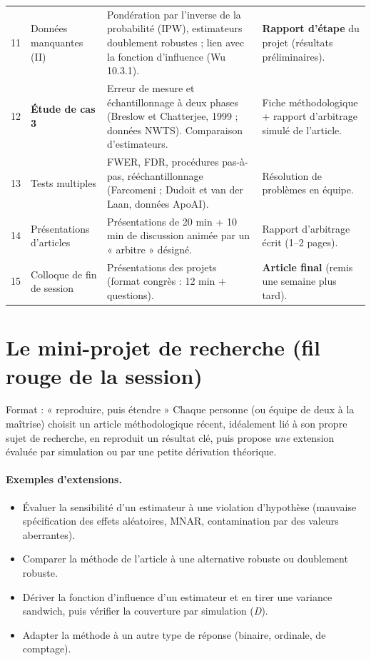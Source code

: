 \documentclass[11pt]{article}
\begin{document}
\begin{longtable}{@{}c L{3.6cm} L{6.3cm} L{4.2cm}@{}}
11 & Données manquantes (II) &
Pondération par l'inverse de la probabilité (IPW), estimateurs doublement robustes ;
lien avec la fonction d'influence (Wu 10.3.1). &
\textbf{Rapport d'étape} du projet (résultats préliminaires).\\
12 & \textbf{Étude de cas 3} &
Erreur de mesure et échantillonnage à deux phases (Breslow et Chatterjee, 1999 ;
données NWTS). Comparaison d'estimateurs. &
Fiche méthodologique + rapport d'arbitrage simulé de l'article.\\
13 & Tests multiples &
FWER, FDR, procédures pas-à-pas, rééchantillonnage (Farcomeni ; Dudoit et van der Laan,
données ApoAI). &
Résolution de problèmes en équipe.\\
14 & Présentations d'articles &
Présentations de 20 min + 10 min de discussion animée par un « arbitre » désigné. &
Rapport d'arbitrage écrit (1--2 pages).\\
15 & Colloque de fin de session &
Présentations des projets (format congrès : 12 min + questions). &
\textbf{Article final} (remis une semaine plus tard).\\
\end{longtable}

\section{Le mini-projet de recherche (fil rouge de la session)}

\begin{encadre}{Format : « reproduire, puis étendre »}
Chaque personne (ou équipe de deux à la maîtrise) choisit un article méthodologique récent,
idéalement lié à son propre sujet de recherche, en reproduit un résultat clé, puis propose
\emph{une} extension évaluée par simulation ou par une petite dérivation théorique.
\end{encadre}

\paragraph{Exemples d'extensions.}
\begin{itemize}
  \item Évaluer la sensibilité d'un estimateur à une violation d'hypothèse (mauvaise
        spécification des effets aléatoires, MNAR, contamination par des valeurs aberrantes).
  \item Comparer la méthode de l'article à une alternative robuste ou doublement robuste.
  \item Dériver la fonction d'influence d'un estimateur et en tirer une variance sandwich,
        puis vérifier la couverture par simulation (\emph{D}).
  \item Adapter la méthode à un autre type de réponse (binaire, ordinale, de comptage).
\end{itemize}
\end{document}
